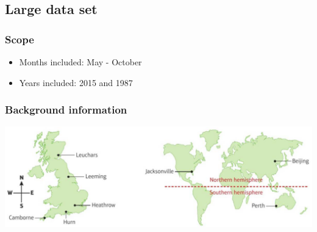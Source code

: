 \documentclass[fleqn, 11pt]{article}
\begin{document}
	\subsection{Large data set}
	\subsubsection{Scope}
	\begin{itemize}
		\item Months included: May - October
		\item Years included: 2015 and 1987
	\end{itemize}
	\subsubsection{Background information}
	\includegraphics{LDSmap}\\
\end{document}
